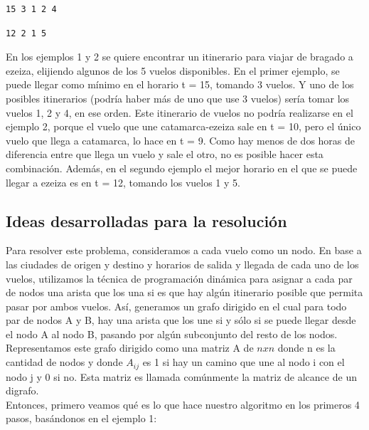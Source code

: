 \documentclass[11pt, a4paper, twoside]{article}
\begin{document}
\begin{minipage}[t]{0.4\textwidth}
\begin{Verbatim}[frame=single,framesep=1cm,label= Salida para instancia 1]
15 3 1 2 4
\end{Verbatim}
\end{minipage}
\hfill
\begin{minipage}[t]{0.4\textwidth}
\begin{Verbatim}[frame=single,framesep=1cm,label= Salida para instancia 2]
12 2 1 5
\end{Verbatim}
\end{minipage}

En los ejemplos 1 y 2 se quiere encontrar un itinerario para viajar de bragado a 
ezeiza, elijiendo algunos de los 5 vuelos disponibles. En el primer ejemplo, se 
puede llegar como mínimo en el horario t = 15, tomando 3 vuelos. Y uno de los
posibles itinerarios (podría haber más de uno que use 3 vuelos) sería tomar los 
vuelos 1, 2 y 4, en ese orden. Este itinerario de vuelos no podría realizarse en
el ejemplo 2, porque el vuelo que une catamarca-ezeiza sale en t = 10, pero el 
único vuelo que llega a catamarca, lo hace en t = 9. Como hay menos de dos horas
de diferencia entre que llega un vuelo y sale el otro, no es posible hacer esta 
combinación. Además, en el segundo ejemplo el mejor horario en el que se puede 
llegar a ezeiza es en t = 12, tomando los vuelos 1 y 5. \\

\subsection{Ideas desarrolladas para la resolución}
Para resolver este problema, consideramos a cada vuelo como un nodo. En base a 
las ciudades de origen y destino y horarios de salida y llegada de cada uno de
los vuelos, utilizamos la técnica de programación dinámica para asignar a cada
par de nodos una arista que los una si es que hay algún itinerario posible que 
permita pasar por ambos vuelos. Así, generamos un grafo dirigido en el cual para 
todo par de nodos A y B, hay una arista que los une si y sólo si se puede llegar 
desde el nodo A al nodo B, pasando por algún subconjunto del resto de los nodos.
Representamos este grafo dirigido como una matriz A de $nxn$ donde n es la cantidad
de nodos y donde $A_{ij}$ es 1 si hay un camino que une al nodo i con el nodo j y
0 si no. Esta matriz es llamada comúnmente la matriz de alcance de un digrafo. \\
Entonces, primero veamos qué es lo que hace nuestro algoritmo en los primeros 4
pasos, basándonos en el ejemplo 1: \\
\end{document}
